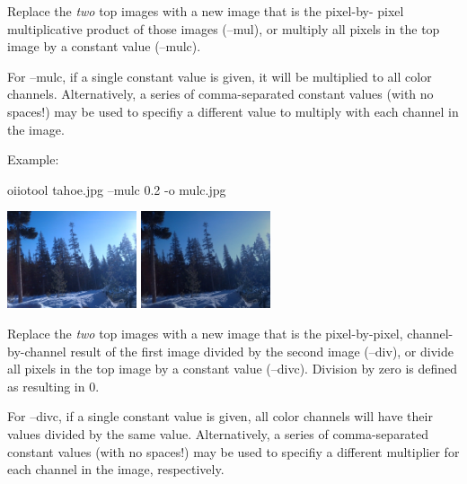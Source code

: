 Replace the \emph{two} top images with a new image that is the pixel-by-
pixel multiplicative product of those images ({\cf --mul}), or multiply all
pixels in the top image by a constant value ({\cf --mulc}).

For {\cf --mulc}, if a single constant value is given, it will be multiplied
to all color channels. Alternatively, a series of comma-separated constant
values (with no spaces!) may be used to specifiy a different value to
multiply with each channel in the image.

\noindent Example:
\begin{code}
    oiiotool tahoe.jpg --mulc 0.2 -o mulc.jpg
\end{code}
\spc \includegraphics[width=1.5in]{figures/tahoe-small.jpg}
\raisebox{40pt}{\large $\rightarrow$}
\includegraphics[width=1.5in]{figures/mulc.jpg} \\
\apiend

Replace the \emph{two} top images with a new image that is the
pixel-by-pixel, channel-by-channel result of the first image divided by
the second image ({\cf --div}), or divide all
pixels in the top image by a constant value ({\cf --divc}).
Division by zero is defined as resulting in 0.

For {\cf --divc}, if a single constant value is given, all color channels
will have their values divided by the same value.  Alternatively, a series
of comma-separated constant values (with no spaces!) may be used to specifiy
a different multiplier for each channel in the image, respectively.
\apiend

